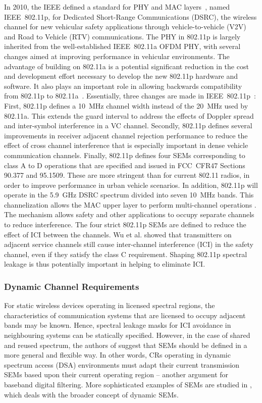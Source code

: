 In 2010, the IEEE defined a standard for PHY and MAC layers~\cite{802-11p2010}, named IEEE~802.11p, for Dedicated Short-Range Communications (DSRC), the wireless channel for new vehicular safety applications through vehicle-to-vehicle (V2V) and Road to Vehicle (RTV) communications.
The PHY in 802.11p is largely inherited from the well-established IEEE~802.11a OFDM PHY, with several changes aimed at improving performance in vehicular environments.
The advantage of building on 802.11a is a potential significant reduction in the cost and development effort necessary to develop the new 802.11p hardware and software.
It also plays an important role in allowing backwards compatibility from 802.11p to 802.11a~\cite{Vandenberghe2011,Fernandez2012}.
Essentially, three changes are made in IEEE~802.11p~\cite{Jiang2008}:
First, 802.11p defines a 10~MHz channel width instead of the 20~MHz used by 802.11a.
This extends the guard interval to address the effects of Doppler spread and inter-symbol interference in a VC channel.
Secondly, 802.11p defines several improvements in receiver adjacent channel rejection performance to reduce the effect of cross channel interference that is especially important in dense vehicle communication channels.
Finally, 802.11p defines four SEMs corresponding to class A to D operations that are specified and issued in FCC~CFR47 Sections 90.377 and 95.1509.
These are more stringent than for current 802.11 radios, in order to improve performance in urban vehicle scenarios.
In addition, 802.11p will operate in the 5.9~GHz DSRC spectrum divided into seven 10~MHz bands. 
This channelization allows the MAC upper layer to perform multi-channel operations \cite{WAVE2010}.
The mechanism allows safety and other applications to occupy separate channels to reduce interference.
The four strict 802.11p SEMs are defined to reduce the effect of ICI between the channels. %
Wu et al. \cite{Wu2013} showed that transmitters on adjacent service channels still cause inter-channel interference (ICI) in the safety channel, even if they satisfy the class C requirement.
Shaping 802.11p  spectral leakage is thus potentially important in helping to eliminate ICI.

\subsubsection{Dynamic Channel Requirements}
For static wireless devices operating in licensed spectral regions, the characteristics of communication systems that are licensed to occupy adjacent bands may be known.
Hence, spectral leakage masks for ICI avoidance in neighbouring systems can be statically specified.
However, in the case of shared and reused spectrum, the authors of \cite{Macaluso2014} suggest that SEMs should be defined in a more general and flexible way.
In other words, CRs operating in dynamic spectrum access (DSA) environments must adapt their current transmission SEMs based upon their current operating region -- another argument for baseband digital filtering.
More sophisticated examples of SEMs are studied in \cite{Forde2010}, which deals with the broader concept of dynamic SEMs.


